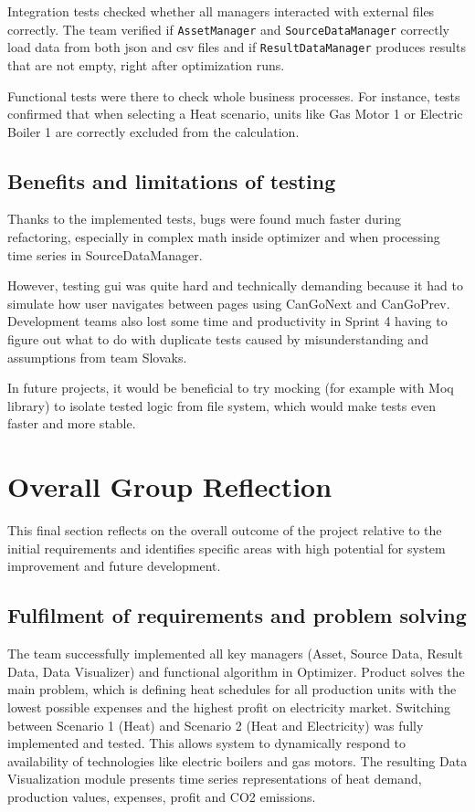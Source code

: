 Integration tests checked whether all managers interacted with external files correctly. The team verified if \texttt{AssetManager} and \texttt{SourceDataManager} correctly load data from both \acrshort{json} and \acrshort{csv} files and if \texttt{ResultDataManager} produces results that are not empty, right after optimization runs.

Functional tests were there to check whole business processes. For instance, tests confirmed that when selecting a Heat scenario, units like Gas Motor 1 or Electric Boiler 1 are correctly excluded from the calculation.

\subsection{Benefits and limitations of testing}
Thanks to the implemented tests, bugs were found much faster during refactoring, especially in complex math inside optimizer and when processing time series in SourceDataManager.

However, testing \acrshort{gui} was quite hard and technically demanding because it had to simulate how user navigates between pages using CanGoNext and CanGoPrev. Development teams also lost some time and productivity in Sprint 4 having to figure out what to do with duplicate tests caused by misunderstanding and assumptions from team Slovaks.

In future projects, it would be beneficial to try mocking (for example with Moq library) to isolate tested logic from file system, which would make tests even faster and more stable.

\section[Reflection]{Overall Group Reflection}
This final section reflects on the overall outcome of the project relative to the initial requirements and identifies specific areas with high potential for system improvement and future development.

\subsection{Fulfilment of requirements and problem solving}
The team successfully implemented all key managers (Asset, Source Data, Result Data, Data Visualizer) and functional algorithm in Optimizer. Product solves the main problem, which is defining heat schedules for all production units with the lowest possible expenses and the highest profit on electricity market. Switching between Scenario 1 (Heat) and Scenario 2 (Heat and Electricity) was fully implemented and tested. This allows system to dynamically respond to availability of technologies like electric boilers and gas motors. The resulting Data Visualization module presents time series representations of heat demand, production values, expenses, profit and CO2 emissions.


